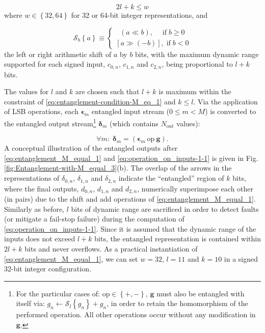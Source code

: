 \documentclass[twocolumn,english,onecolumn]{IEEEtran}
\theoremstyle{plain}
\theoremstyle{plain}
\begin{document}
\begin{equation}
2l+k\leq w\label{eq:entanglement-condition-M_eq_1}
\end{equation}
where $w\in\left\{ 32,64\right\} $ for 32 or 64-bit integer representations,
and

\begin{equation}
\mathcal{S}_{b}\left\{ a\right\} \equiv\left\{ \begin{array}{c}
\;\;\left(a\ll b\right),\;\;\;\;\,\text{if}\; b\geq0\\
\left[a\gg\left(-b\right)\right],\;\text{if}\; b<0
\end{array}\right.
\end{equation}
the left or right arithmetic shift of $a$ by $b$ bits, with the
maximum dynamic range supported for each signed input, $c_{0,n}$,
$c_{1,n}$ and $c_{2,n}$, being proportional to $l+k$ bits.

The values for $l$ and $k$ are chosen such that $l+k$ is maximum
within the constraint of \eqref{eq:entanglement-condition-M_eq_1}
and $k\leq l$. Via the application of LSB operations, each $\boldsymbol{\epsilon}_{m}$
entangled input stream ($0\leq m<M$) is converted to the entangled
output stream\footnote{For the particular cases of: $\text{op}\in\left\{ +,-\right\} $,
$\mathbf{g}$ must also be entangled with itself via: $g_{n}\leftarrow\mathcal{S}_{l}\left\{ g_{n}\right\} +g_{n}$,
in order to retain the homomorphism of the performed operation. All
other operations occur without any modification in $\mathbf{g}$.} $\boldsymbol{\delta}_{m}$ (which contains $N_{\text{out}}$ values): 

\begin{equation}
\forall m:\boldsymbol{\;\delta}_{m}=\left(\boldsymbol{\epsilon}_{m}\:\text{op}\:\mathbf{g}\right).\label{eq:operation_on_inputs-1-1}
\end{equation}
A conceptual illustration of the entangled outputs after \eqref{eq:entanglement_M_equal_1}
and \eqref{eq:operation_on_inputs-1-1} is given in Fig. \ref{fig:Entanglement-with-M_equal_3}(b).
The overlap of the arrows in the representations of $\delta_{0,n}$,
$\delta_{1,n}$ and $\delta_{2,n}$ indicate the ``entangled'' region
of $k$ bits, where the final outputs, $d_{0,n}$, $d_{1,n}$ and
$d_{2,n}$, numerically superimpose each other (in pairs) due to the
shift and add operations of \eqref{eq:entanglement_M_equal_1}. Similarly
as before, $l$ bits of dynamic range are sacrificed in order to detect
faults (or mitigate a fail-stop failure) during the computation of
\eqref{eq:operation_on_inputs-1-1}. Since it is assumed that the
dynamic range of the inputs does not exceed $l+k$ bits, the entangled
representation is contained within $2l+k$ bits and never overflows.
As a practical instantiation of \eqref{eq:entanglement_M_equal_1},
we can set $w=32$, $l=11$ and $k=10$ in a signed 32-bit integer
configuration. 
\end{document}
